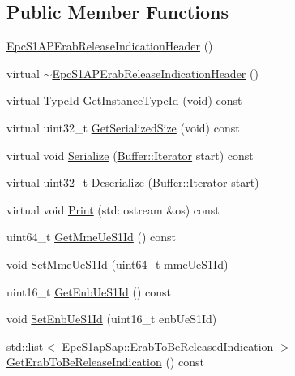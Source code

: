 \subsection*{Public Member Functions}
\begin{DoxyCompactItemize}
\item 
\hyperlink{classns3_1_1EpcS1APErabReleaseIndicationHeader_a50cfc38c89b982e3eca79b7eb8866b97}{Epc\+S1\+A\+P\+Erab\+Release\+Indication\+Header} ()
\item 
virtual \hyperlink{classns3_1_1EpcS1APErabReleaseIndicationHeader_a13c64711c82b8fd14c91b81fe59e05ac}{$\sim$\+Epc\+S1\+A\+P\+Erab\+Release\+Indication\+Header} ()
\item 
virtual \hyperlink{classns3_1_1TypeId}{Type\+Id} \hyperlink{classns3_1_1EpcS1APErabReleaseIndicationHeader_a61afb0a43f78912c2ca0e6fbf596c068}{Get\+Instance\+Type\+Id} (void) const 
\item 
virtual uint32\+\_\+t \hyperlink{classns3_1_1EpcS1APErabReleaseIndicationHeader_ad5a04c8ed9f483513dff1cc66ca9f8fa}{Get\+Serialized\+Size} (void) const 
\item 
virtual void \hyperlink{classns3_1_1EpcS1APErabReleaseIndicationHeader_a166f941727ec16c9cf2448581873cea3}{Serialize} (\hyperlink{classns3_1_1Buffer_1_1Iterator}{Buffer\+::\+Iterator} start) const 
\item 
virtual uint32\+\_\+t \hyperlink{classns3_1_1EpcS1APErabReleaseIndicationHeader_a36372fbdcd57de3a3f7ee8c5e3269021}{Deserialize} (\hyperlink{classns3_1_1Buffer_1_1Iterator}{Buffer\+::\+Iterator} start)
\item 
virtual void \hyperlink{classns3_1_1EpcS1APErabReleaseIndicationHeader_a3241525161e751dd2288b5a8f601d8fc}{Print} (std\+::ostream \&os) const 
\item 
uint64\+\_\+t \hyperlink{classns3_1_1EpcS1APErabReleaseIndicationHeader_a556f526ddd372f856a4da462a35e694b}{Get\+Mme\+Ue\+S1\+Id} () const 
\item 
void \hyperlink{classns3_1_1EpcS1APErabReleaseIndicationHeader_a1d448dff8370f922a63532e5659f9ed7}{Set\+Mme\+Ue\+S1\+Id} (uint64\+\_\+t mme\+Ue\+S1\+Id)
\item 
uint16\+\_\+t \hyperlink{classns3_1_1EpcS1APErabReleaseIndicationHeader_a175d0b89bb095879f7f7e87f805839a9}{Get\+Enb\+Ue\+S1\+Id} () const 
\item 
void \hyperlink{classns3_1_1EpcS1APErabReleaseIndicationHeader_ad0505f93e1da5fab24d44d3b50a6de00}{Set\+Enb\+Ue\+S1\+Id} (uint16\+\_\+t enb\+Ue\+S1\+Id)
\item 
\hyperlink{openflow-interface_8h_afd9bcfa176617760671b67580f536fa7}{std\+::list}$<$ \hyperlink{structns3_1_1EpcS1apSap_1_1ErabToBeReleasedIndication}{Epc\+S1ap\+Sap\+::\+Erab\+To\+Be\+Released\+Indication} $>$ \hyperlink{classns3_1_1EpcS1APErabReleaseIndicationHeader_a360c3da9a8133b304f15c0b52c0ef4d2}{Get\+Erab\+To\+Be\+Release\+Indication} () const 

\end{DoxyCompactItemize}
